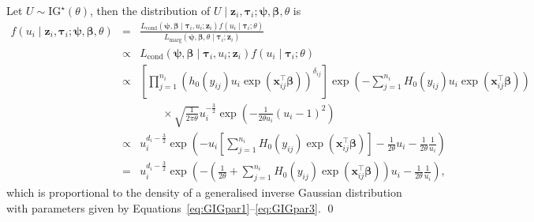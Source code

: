Let $U \sim \textrm{IG}^{\star} ( \theta)$, then the distribution of 
  $U \mid \bm{z}_{i}, \bm \tau_i; \bm{\psi}, \bm{\beta}, \theta$ is
\begin{eqnarray*}
f ( u_i \mid \bm{z}_{i}, \bm{\tau}_i; \bm{\psi}, \bm{\beta}, \theta ) 
  & = & \frac{
    L_{\textrm{cond}} \left( \bm{\psi}, \bm{\beta} \mid \bm{\tau}_{i}, u_{i}; \bm{z}_i \right) f ( u_{i} \mid \bm{\tau}_{i}; \theta )
  }{
    L_{\textrm{marg}} \left( \bm{\psi}, \bm{\beta}, \theta \mid \bm{\tau}_{i}; \bm{z}_i \right)
  } \\
  &\propto & L_{\textrm{cond}} \left( \bm{\psi}, \bm{\beta} \mid \bm{\tau}_{i}, u_{i}; \bm{z}_i \right) f ( u_{i} \mid \bm{\tau}_{i}; \theta ) \\
  & \propto & \displaystyle \left[ 
      \prod_{j=1}^{n_{i}} \left( h_{0} ( y_{ij} ) u_i \exp ( \bm{x}^\top_{ij} \bm{\beta} ) \right)^{\delta_{ij}} 
    \right] 
    \exp \left( - \sum_{j=1}^{n_{i}} H_{0} ( y_{ij} ) u_i \exp ( \bm{x}^\top_{ij} \bm{\beta} ) \right) \\
    && \qquad \times \sqrt{\frac{1}{2 \pi \theta}} 
    u_i^{-\tfrac32} 
    \exp \left( -\frac{1}{2 \theta u_{i}} ( u_i - 1 )^{2} \right)   \\
  &\propto& u_i^{d_i - \tfrac32} \exp \left( - u_i 
    \left[\sum_{j=1}^{n_{i}} H_{0} ( y_{ij} ) \exp ( \bm{x}^\top_{ij} \bm{\beta} ) \right] - 
          \frac{1}{2 \theta} u_i - \frac{1}{2 \theta} \frac{1}{u_{i}} \right) \\
  & = & u_{i}^{d_i - \tfrac32} \exp \left( - \left( \frac{1}{2 \theta} + \sum_{j=1}^{n_{i}} H_{0} ( y_{ij} ) \exp ( \bm{x}^\top_{ij} \bm{\beta} ) \right) u_i - 
          \frac{1}{2 \theta} \frac{1}{u_{i}} \right),
\end{eqnarray*}
which is proportional to the density of a generalised inverse Gaussian distribution \cite[Section~A.3.6]{Hougaard00}
with parameters given by Equations~\ref{eq:GIGpar1}--\ref{eq:GIGpar3}.
\qed